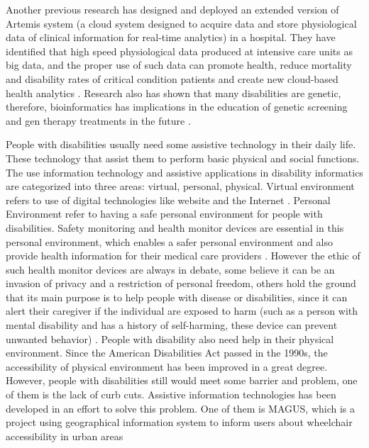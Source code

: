 Another previous research has
designed and deployed an extended version of Artemis system (a cloud system designed to acquire data and
store physiological data of clinical information for real-time analytics) in a hospital. They have
identified that high speed physiological data produced at intensive care units as big data, and the proper
use of such data can promote health, reduce mortality and disability rates of critical condition patients
and create new cloud-based health analytics \cite{Khazaei14}. Research also has shown that many
disabilities are genetic, therefore, bioinformatics has implications in the education of genetic screening
and gen therapy treatments in the future \cite{Appleyard2005}.

People with disabilities usually need some 
assistive technology in their daily life. These technology that assist them to perform basic physical and 
social functions. The use information technology and assistive applications in disability informatics are 
categorized into three areas: virtual, personal, physical. Virtual environment refers to use of digital technologies like website and the Internet \cite{Appleyard2005}. 
Personal Environment refer to having a safe personal environment for people with disabilities. Safety monitoring and health monitor devices are essential in this personal environment, which enables a safer  personal environment and also provide health information for their medical care providers
 \cite{Appleyard2005}. However the ethic of such health monitor devices are always in debate, some believe
 it can be an invasion of privacy and a restriction of personal freedom, others hold the ground that its
 main purpose is to help people with disease or disabilities, since it can alert their caregiver if the
 individual are exposed to harm (such as a person with mental disability and has a history of self-harming,
 these device can prevent unwanted behavior) \cite{cunningham2017cloud}. 
People with disability also need help in their physical environment. Since the American Disabilities Act passed in the 1990s, the accessibility of physical environment has been
improved in a great degree. However, people with disabilities still would meet some barrier and problem, 
one of them is the lack of curb cuts. Assistive information technologies has been developed in an effort to
solve this problem. One of them is MAGUS, which is a project using geographical information system to inform 
users about wheelchair accessibility in urban areas \cite{Appleyard2005}

